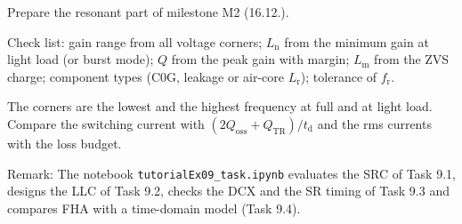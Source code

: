 

Prepare the resonant part of milestone M2 (16.12.).


\begin{solutionblock}
	Check list: gain range from all voltage corners; $L_\mathrm{n}$ from the minimum gain at light load (or burst mode); $Q$ from the peak gain with margin; $L_\mathrm{m}$ from the ZVS charge; component types (C0G, leakage or air-core $L_\mathrm{r}$); tolerance of $f_\mathrm{r}$.
\end{solutionblock}


\begin{solutionblock}
	The corners are the lowest and the highest frequency at full and at light load. Compare the switching current with $(2Q_\mathrm{oss}+Q_\mathrm{TR})/t_\mathrm{d}$ and the rms currents with the loss budget.
\end{solutionblock}

\vspace{0.5cm}
Remark: The notebook \texttt{tutorialEx09\_task.ipynb} evaluates the SRC of Task 9.1, designs the LLC of Task 9.2, checks the DCX and the SR timing of Task 9.3 and compares FHA with a time-domain model (Task 9.4).
